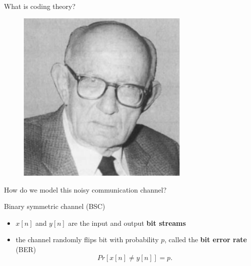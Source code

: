 \documentclass[10pt]{beamer}
\begin{document}
\begin{frame}{What is coding theory?}
\begin{figure}[ht]
\begin{minipage}{0.32\textwidth}
            \includegraphics[width=0.74\textwidth]{img/golay.png}
        \end{minipage}
    \end{figure}
\end{frame}

\begin{frame}{How do we model this noisy communication channel?}
    \begin{block}{Binary symmetric channel (BSC)}
        \begin{figure}[h]
            \centering
        \end{figure}
        \begin{itemize}
            \item $x[n]$ and $y[n]$ are the input and output \textbf{bit streams}
            \item the channel randomly flips bit with probability $p$, called the \textbf{bit
            error rate} (BER)
            \[ Pr\left[x[n] \neq y[n]\right] = p. \]
        \end{itemize}
    \end{block}
\end{frame}
\end{document}
